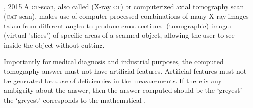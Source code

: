 
\begin{example} \label{eg:ctscan}
\ 
\begin{quoted}{, 2015}
A \textsc{ct}-scan, also called     (X-ray \textsc{ct}) or computerized axial {tomography} scan (\textsc{cat} scan), makes use of computer-processed combinations of many X-ray images taken from different angles to produce cross-sectional (tomographic) images (virtual 'slices') of specific areas of a scanned object, allowing the user to see inside the object without cutting.
\end{quoted}
Importantly for medical diagnosis and industrial purposes, the computed tomography answer must not have artificial features.
Artificial features must not be generated because of deficiencies in the measurements.
If there is any ambiguity about the answer, then the answer computed should be the `greyest'---the `greyest' corresponds to the mathematical .


\end{example}
